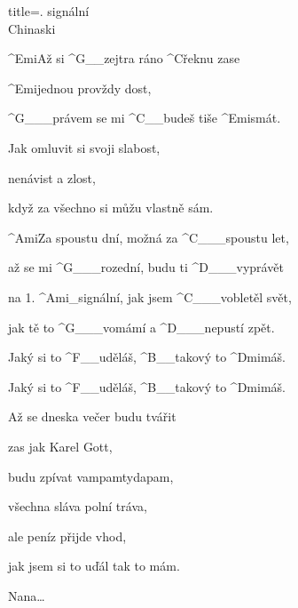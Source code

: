 \begin{song}{title=\predtitle {}. signální \\\large Chinaski  \vspace*{-0.3cm}}  %
\begin{centerjustified}
\nejnejvetsi
\sloka 
	^{Emi}Až si ^{G{\color{white}\_\_}}zejtra ráno ^{C}řeknu zase 

	^{Emi}jednou provždy dost,

	^{G{\color{white}\_\_\_}}právem se mi ^{C{\color{white}\_\_}}budeš tiše ^{Emi}smát.

	Jak omluvit si svoji slabost,

	nenávist a zlost,

	když za všechno si můžu vlastně sám. 

	^{Ami}Za spoustu dní, možná za ^{C{\color{white}\_\_\_}}spoustu let, 

	až se mi ^{G{\color{white}\_\_\_}}rozední, budu ti ^{D{\color{white}\_\_\_}}vyprávět 

	na 1. ^{Ami{\color{white}\_}}signální, jak jsem ^{C{\color{white}\_\_\_}}vobletěl svět, 

	jak tě to ^{G{\color{white}\_\_\_}}vomámí a ^{D{\color{white}\_\_\_}}nepustí zpět.

	Jaký si to ^{F{\color{white}\_\_}}uděláš, ^{B{\color{white}\_\_}}takový to ^{Dmi}máš. 

	Jaký si to ^{F{\color{white}\_\_}}uděláš, ^{B{\color{white}\_\_}}takový to ^{Dmi}máš. 

\sloka
	Až se dneska večer budu tvářit
	
	zas jak Karel Gott, 
	
	budu zpívat vampamtydapam,
	
	všechna sláva polní tráva,
	
	ale peníz přijde vhod,
	
	jak jsem si to uďál tak to mám.


\sloka Nana\elipsa\dots

\end{centerjustified}
\setcounter{Slokočet}{0}
\end{song}
